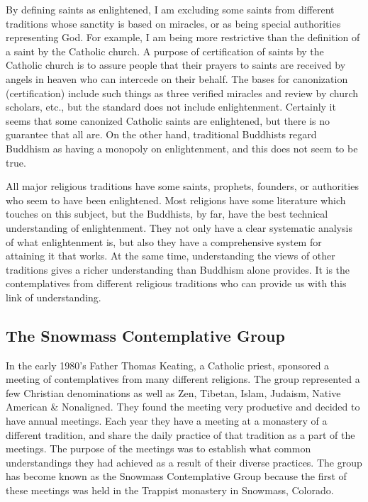 \documentclass[a5paper,10pt,english]{book}
\begin{document}
\sphinxAtStartPar
By defining saints as enlightened, I am excluding some saints from
different traditions whose sanctity is based on miracles, or as being
special authorities representing God. For example, I am being more
restrictive than the definition of a saint by the Catholic church. A
purpose of certification of saints by the Catholic church is to assure
people that their prayers to saints are received by angels in heaven who
can intercede on their behalf. The bases for canonization
(certification) include such things as three verified miracles and
review by church scholars, etc., but the standard does not include
enlightenment. Certainly it seems that some canonized Catholic saints are
enlightened, but there is no guarantee that all are. On the other hand,
traditional Buddhists regard Buddhism as having a monopoly on
enlightenment, and this does not seem to be true.

\sphinxAtStartPar
All major religious traditions have some saints, prophets, founders, or
authorities who seem to have been enlightened. Most religions have some
literature which touches on this subject, but the Buddhists, by far,
have the best technical understanding of enlightenment. They not only
have a clear systematic analysis of what enlightenment is, but also they
have a comprehensive system for attaining it that works. At the same
time, understanding the views of other traditions gives a richer
understanding than Buddhism alone provides. It is the contemplatives
from different religious traditions who can provide us with this link of
understanding.


\subsection{The Snowmass Contemplative Group}
\label{\detokenize{saints:the-snowmass-contemplative-group}}
\sphinxAtStartPar
In the early 1980’s Father Thomas Keating, a Catholic priest, sponsored
a meeting of contemplatives from many different religions. The group
represented a few Christian denominations as well as Zen, Tibetan,
Islam, Judaism, Native American \& Nonaligned. They found the meeting
very productive and decided to have annual meetings. Each year they have
a meeting at a monastery of a different tradition, and share the daily
practice of that tradition as a part of the meetings. The purpose of the
meetings was to establish what common understandings they had achieved
as a result of their diverse practices. The group has become known as
the Snowmass Contemplative Group because the first of these meetings was
held in the Trappist monastery in Snowmass, Colorado.
\end{document}

